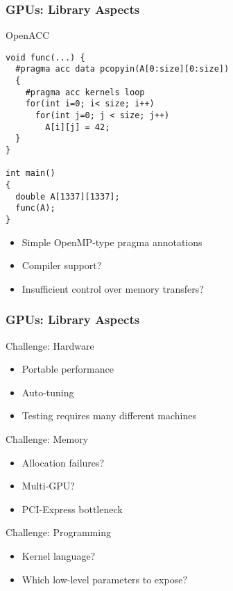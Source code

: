 \begin{frame}[fragile]
\frametitle{GPUs: Library Aspects}
 \begin{block}{OpenACC}
  \begin{lstlisting}
void func(...) {
  #pragma acc data pcopyin(A[0:size][0:size])
  {
    #pragma acc kernels loop
    for(int i=0; i< size; i++)
      for(int j=0; j < size; j++)
        A[i][j] = 42;
  }
}

int main()
{
  double A[1337][1337];
  func(A);
}
  \end{lstlisting}

  \begin{itemize}
   \item Simple OpenMP-type pragma annotations
   \item Compiler support?
   \item Insufficient control over memory transfers?
  \end{itemize}
 \end{block}

\end{frame}


\begin{frame}[fragile]
\frametitle{GPUs: Library Aspects}

 \begin{block}{Challenge: Hardware}
  \begin{itemize}
   \item Portable performance
   \item Auto-tuning
   \item Testing requires many different machines
  \end{itemize}
 \end{block}

 \begin{block}{Challenge: Memory}
  \begin{itemize}
   \item Allocation failures?
   \item Multi-GPU?
   \item PCI-Express bottleneck
  \end{itemize}
 \end{block}

 \begin{block}{Challenge: Programming}
  \begin{itemize}
   \item Kernel language?
   \item Which low-level parameters to expose?
  \end{itemize}
 \end{block}

\end{frame}


